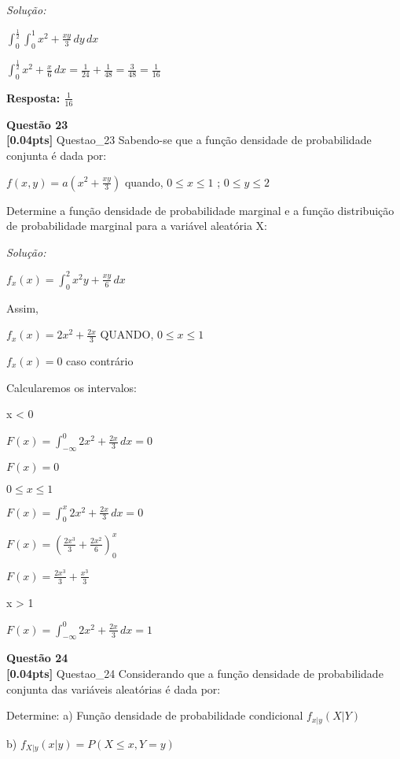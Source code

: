 \documentclass{article}
\newenvironment{problem}[2][Questão]
    { \begin{mdframed}[backgroundcolor=gray!20] \textbf{#1 #2} \\}
    {  \end{mdframed}}
\newenvironment{solution}
    {\textit{Solução:}}
    {}
\begin{document}
\begin{solution}

$\int_{0}^{\frac{1}{2}} \int_{0}^{1} x^{2} + \frac{xy}{3} \, dy \, dx$

$\int_{0}^{\frac{1}{2}} x^{2} + \frac{x}{6} \, dx = \frac{1}{24}+\frac{1}{48} = \frac{3}{48} = \frac{1}{16}$

\textbf{Resposta: $\frac{1}{16}$}



\end{solution}

\begin{problem}{23}
\textbf{[0.04pts]} Questao\_23 Sabendo-se que a função densidade de probabilidade conjunta é dada por:

$f(x,y) = a(x^{2} + \frac{xy}{3})$ quando, $0 \leq x \leq 1$ ; $0 \leq y \leq 2$

Determine  a  função  densidade  de  probabilidade  marginal  e  a  função  distribuição  de 
probabilidade marginal para a variável aleatória X:
\end{problem}

\begin{solution}

$f_{x}(x) = \int_{0}^{2} x^{2}y + \frac{xy}{6} \, dx$

Assim,

$f_{x}(x) = 2x^{2} + \frac{2x}{3}$ QUANDO, $0 \leq x \leq 1$

$f_{x}(x) = 0$ caso contrário

Calcularemos os intervalos:

x < 0

$F(x) = \int_{-\infty}^{0} 2x^{2} + \frac{2x}{3} \, dx = 0$

$F(x) = 0$

$0 \leq x \leq 1$

$F(x) = \int_{0}^{x} 2x^{2} + \frac{2x}{3} \, dx = 0$

$F(x) = (\frac{2x^{3}}{3} + \frac{2x^{2}}{6})_{0}^{x}$

$F(x) = \frac{2x^{3}}{3}+\frac{x^{3}}{3}$

x > 1

$F(x) = \int_{-\infty}^{0} 2x^{2} + \frac{2x}{3} \, dx = 1$


\end{solution}

\begin{problem}{24}
\textbf{[0.04pts]} Questao\_24 Considerando  que  a  função  densidade  de  probabilidade  conjunta  das  variáveis aleatórias é dada por:

Determine: 
a) Função densidade de probabilidade condicional $f_{x|y}(X|Y)$

b) $f_{X|y}(x|y) = P(X \leq x, Y=y)$

\end{problem}
\end{document}
